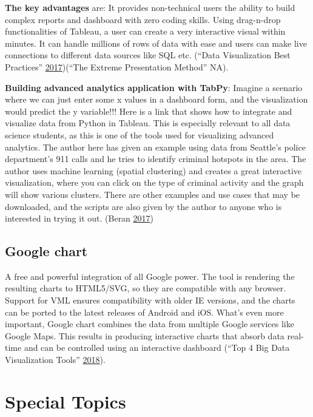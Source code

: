 \documentclass[]{book}
\theoremstyle{definition}
\theoremstyle{definition}
\theoremstyle{definition}
\theoremstyle{remark}
\begin{document}
\textbf{The key advantages} are: It provides non-technical users the
ability to build complex reports and dashboard with zero coding skills.
Using drag-n-drop functionalities of Tableau, a user can create a very
interactive visual within minutes. It can handle millions of rows of
data with ease and users can make live connections to different data
sources like SQL etc. (``Data Visualization Best Practices''
\protect\hyperlink{ref-VizBP}{2017})(``The Extreme Presentation Method''
NA).

\textbf{Building advanced analytics application with TabPy}: Imagine a
scenario where we can just enter some x values in a dashboard form, and
the visualization would predict the y variable!!! Here is a link that
shows how to integrate and visualize data from Python in Tableau. This
is especially relevant to all data science students, as this is one of
the tools used for visualizing advanced analytics. The author here has
given an example using data from Seattle's police department's 911 calls
and he tries to identify criminal hotspots in the area. The author uses
machine learning (spatial clustering) and creates a great interactive
visualization, where you can click on the type of criminal activity and
the graph will show various clusters. There are other examples and use
cases that may be downloaded, and the scripts are also given by the
author to anyone who is interested in trying it out. (Beran
\protect\hyperlink{ref-TabPy}{2017})

\subsection{Google chart}\label{google-chart}

A free and powerful integration of all Google power. The tool is
rendering the resulting charts to HTML5/SVG, so they are compatible with
any browser. Support for VML ensures compatibility with older IE
versions, and the charts can be ported to the latest releases of Android
and iOS. What's even more important, Google chart combines the data from
multiple Google services like Google Maps. This results in producing
interactive charts that absorb data real-time and can be controlled
using an interactive dashboard (``Top 4 Big Data Visualization Tools''
\protect\hyperlink{ref-top4_viz_tools}{2018}).

\section{Special Topics}\label{special-topics}
\end{document}
